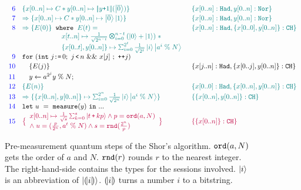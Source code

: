 \begin{figure}[t]
{\[\begin{array}{r l l}
\textcolor{blue}{6}
&
\textcolor{teal}{
\{x[0..n] \mapsto C * y[0..n] \mapsto \dabs{y\splus 1}(\ket{\overline{0}}) \}
}
&
\textcolor{teal}{
\{x[0..n]: \thadt, y[0..n]: \tnort\}
}
\\[0.2em]
\textcolor{blue}{7}
&
\textcolor{teal}{
\Rightarrow
\{x[0..n] \mapsto C * y[0..n] \mapsto \ket{\overline{0}}\ket{1} \}
}
&
\textcolor{teal}{
\{x[0..n]: \thadt, y[0..n]: \tnort\}
}
\\[0.2em]
\textcolor{blue}{8}
& 
\textcolor{teal}{
\Rightarrow
\{ E(0) \}
}
\;\;
\texttt{where}\;\;
\textcolor{teal}{E(t) =}
&
\textcolor{teal}{
\{x[0..n]: \thadt, \{x[0..0],y[0..n]\}: \tcht\}
}
\\
&
\qquad\qquad\quad\;
\textcolor{teal}{
\begin{array}{l}
x[t..n] \mapsto \shadi{2^{n \,\sminus\,  t}}{n \,\sminus\, t}{}\;*
\\
\{x[0..t],y[0..n]\} \mapsto \schai{2^t}{\frac{1}{\sqrt{2^t}}}{i}{\ket{a^{i}\;\%\;N}}
\end{array}
}
\\[0.2em]
\textcolor{blue}{9}
&\sqforh{\sint{j}{0}}{j\,\slt\, n}{x[j]}{\dplus{j}}
\\[0.2em]
\textcolor{blue}{10}
&
\quad\{E(j) \}
&
\{x[j..n]: \thadt, \{x[0..j],y[0..n]\}: \tcht\}
\\[0.2em]
\textcolor{blue}{11}
&
\quad\ssassign{y}{}{a^{2^j}y\;\%\; N};
\\[0.2em]
\textcolor{blue}{12}
&
\textcolor{teal}{
\{E(n) \}
}
&
\textcolor{teal}{
\{x[0..0]: \thadt, \{x[0..n],y[0..n]\}: \tcht\}
}
\\[0.2em]
\textcolor{blue}{13}
&
\textcolor{teal}{
\Rightarrow
\{\{x[0..n],y[0..n]\} \mapsto \schai{2^{n}}{\frac{1}{\sqrt{2^{n}}}}{i}{\ket{a^{i}\;\%\;N}} \}
}
&
\textcolor{teal}{
\{\{x[0..n],y[0..n]\}: \tcht\}
}
\\[0.2em]
\textcolor{blue}{14}
& \sexp{u}{\smea{y}}{...}
\\[0.2em]
\textcolor{blue}{15}
&
\textcolor{purple}{
\big{\{}
\begin{array}{l}
x[0..n] \mapsto \smch{\frac{1}{\sqrt{s}}}{s}{t\,\splus\,k p} 
\wedge
p = \texttt{ord}(a,N)
\\
\wedge\;
u=(\frac{p}{2^n},a^{t}\;\%\;N)
\wedge
s=\texttt{rnd}(\frac{2^n}{p})
\end{array}
\big{\}}
}
&
\textcolor{purple}{
\{\{x[0..n]\}: \tcht\}
}
\end{array}
\]
}
\vspace*{-1em}
\caption{Pre-measurement quantum steps of the Shor's algorithm. $\texttt{ord}({a,N})$ gets the order of $a$ and $N$. $\texttt{rnd}({r})$ rounds $r$ to the nearest integer. The right-hand-side contains the types for the sessions involved. $\left\vert{i}\right\rangle$ is an abbreviation of $\left\vert{(\!| i |\!)}\right\rangle$.
$(\!| i |\!)$ turns a number $i$ to a bitstring. }
\label{fig:shorqafny}
\end{figure}


